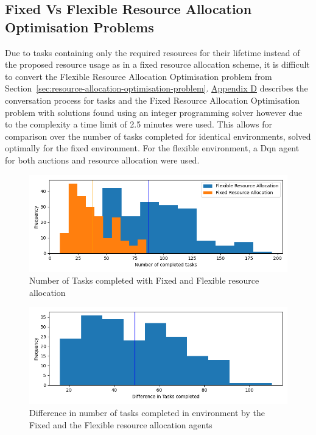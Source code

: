 \subsection{Fixed Vs Flexible Resource Allocation Optimisation Problems}
\label{subsec:fixed-vs-flexible-resource-allocation-optimisation-problems}
Due to tasks containing only the required resources for their lifetime instead of the proposed resource usage as in a
fixed resource allocation scheme, it is difficult to convert the Flexible Resource Allocation Optimisation problem from
Section~\ref{sec:resource-allocation-optimisation-problem}.
\hyperref[app:fixed-resource-allocation-optimisation-problem]{Appendix D} describes the conversation process for tasks
and the Fixed Resource Allocation Optimisation problem with solutions found using an integer programming solver however
due to the complexity a time limit of 2.5 minutes were used. This allows for comparison over the number of tasks
completed for identical environments, solved optimally for the fixed environment. For the flexible environment, a Dqn
agent for both auctions and resource allocation were used.

\begin{figure}[H]
    \centering
    \includegraphics[width=\textwidth]{figures/5_evaluation_figs/fixed_flexible_completed_tasks.png}
    \caption{Number of Tasks completed with Fixed and Flexible resource allocation}
    \label{fig:number-task-completed-fixed-flexible}
\end{figure}

\begin{figure}[H]
    \centering
    \includegraphics[width=\textwidth]{figures/5_evaluation_figs/fixed_flexible_tasks_difference.png}
    \caption{Difference in number of tasks completed in environment by the Fixed and the Flexible resource allocation agents}
    \label{fig:difference-number-task-completed-fixed-flexible}
\end{figure}

